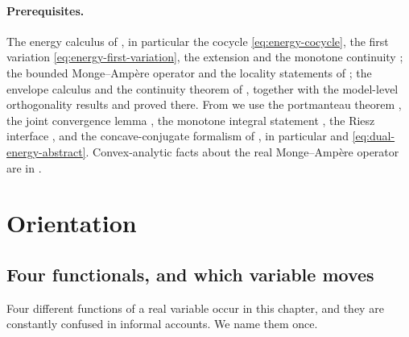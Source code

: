 \paragraph{Prerequisites.}
The energy calculus of , in particular the cocycle
\eqref{eq:energy-cocycle}, the first variation
\eqref{eq:energy-first-variation}, the extension
 and the monotone continuity
; the bounded Monge--Amp\`ere operator
 and the locality statements of
; the envelope calculus
 and the continuity theorem
 of , together
with the model-level orthogonality results
 and
 proved there.  From
 we use the portmanteau theorem
, the joint convergence lemma
, the monotone integral statement
, the Riesz interface
, and the concave-conjugate formalism of
, in particular
 and \eqref{eq:dual-energy-abstract}.
Convex-analytic facts about the real Monge--Amp\`ere operator are in
.

\section{Orientation}
\label{sec:ch27-orientation}

\subsection{Four functionals, and which variable moves}
\label{sec:ch27-four-functionals}

Four different functions of a real variable occur in this chapter, and they
are constantly confused in informal accounts.  We name them once.

